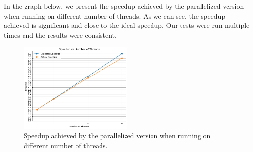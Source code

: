 \documentclass{article}
\begin{document}
In the graph below, we present the speedup achieved by the parallelized version 
when running on different number of threads. As we can see, the speedup achieved 
is significant and close to the ideal speedup. Our tests were run multiple times 
and the results were consistent.

\begin{figure}[htbp]
    \centering
    \includegraphics[width=0.5\textwidth]{img/speedup-threads.png}
    \caption{Speedup achieved by the parallelized version when running on different number of threads.}
    \label{fig:name}
\end{figure}

\newpage



% 

\end{document}
